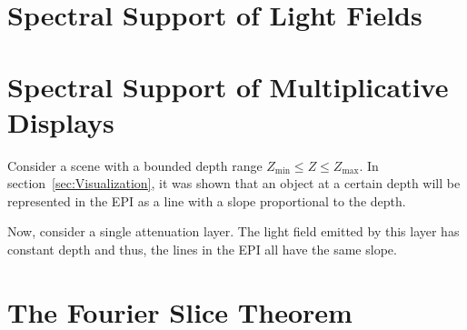 \section{Spectral Support of Light Fields}



\begin{figure}
	\centering
	
	\caption{}
	\label{fig:epi_fourier_transform_1}
\end{figure}


\section{Spectral Support of Multiplicative Displays}
\label{sec:Spectral_Support}

Consider a scene with a bounded depth range $Z_{\text{min}} \leq Z \leq Z_{\text{max}}$.
In section~\ref{sec:Visualization}, it was shown that an object at a certain depth will be represented in the EPI as a line with a slope proportional to the depth.



Now, consider a single attenuation layer. 
The light field emitted by this layer has constant depth and thus, the lines in the EPI all have the same slope.


\section{The Fourier Slice Theorem}